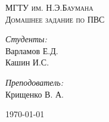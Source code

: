 \begin{titlepage}
 
\begin{center}
 
 

 
\textsc{\LARGE МГТУ им. Н.Э.Баумана}\\[1.5cm]
 
\textsc{\Large Домашнее задание  по ПВС}\\[0.5cm]
 
 

 
\begin{minipage}{0.4\textwidth}
\begin{flushleft} \large
\emph{Студенты:}\\
Варламов Е.Д. \\
Кашин И.С.
\end{flushleft}
\end{minipage}
\begin{minipage}{0.4\textwidth}
\begin{flushright} \large
\emph{Преподователь:} \\
Крищенко В. А.
\end{flushright}
\end{minipage}
 
\vfill
 
{\large \today}
 
\end{center}
 
\end{titlepage}
